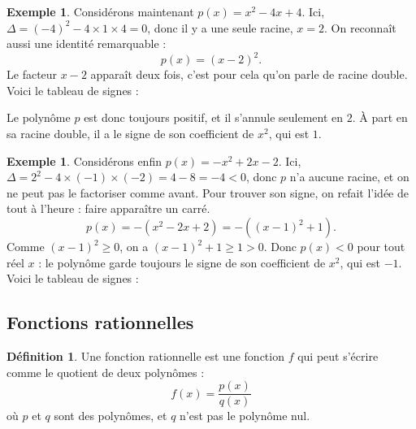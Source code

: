 \documentclass[12pt,a4paper]{article}
\theoremstyle{plain}
\theoremstyle{definition}
\newtheorem{definition}[theorem]{Définition}
\newtheorem{example}[theorem]{Exemple}
\theoremstyle{remark}
\begin{document}
\begin{example}
  Considérons maintenant $p(x) = x^2 - 4x + 4$. Ici,
  $\Delta = (-4)^2 - 4 \times 1 \times 4 = 0$, donc il y a une seule racine,
  $x = 2$. On reconnaît aussi une identité remarquable :
  \[
  p(x) = (x - 2)^2.
  \]
  Le facteur $x - 2$ apparaît deux fois, c'est pour cela qu'on parle de racine
  double. Voici le tableau de signes :
  
  \begin{center}
  \end{center}
  
  Le polynôme $p$ est donc toujours positif, et il s'annule seulement en $2$.
  À part en sa racine double, il a le signe de son coefficient de $x^2$, qui
  est $1$.
\end{example}

\begin{example}
  Considérons enfin $p(x) = -x^2 + 2x - 2$. Ici,
  $\Delta = 2^2 - 4 \times (-1) \times (-2) = 4 - 8 = -4 < 0$, donc $p$ n'a
  aucune racine, et on ne peut pas le factoriser comme avant. Pour trouver son
  signe, on refait l'idée de tout à l'heure : faire apparaître un carré.
  \[
  p(x) = -(x^2 - 2x + 2) = -\left((x - 1)^2 + 1\right).
  \]
  Comme $(x - 1)^2 \ge 0$, on a $(x - 1)^2 + 1 \ge 1 > 0$. Donc $p(x) < 0$ pour
  tout réel $x$ : le polynôme garde toujours le signe de son coefficient de
  $x^2$, qui est $-1$. Voici le tableau de signes :
  
  \begin{center}
  \end{center}
\end{example}

\subsection{Fonctions rationnelles}

\begin{tcolorbox}[navybar]
  \begin{definition}
    Une fonction rationnelle est une fonction $f$ qui peut s'écrire comme le
    quotient de deux polynômes :
    \[
    f(x) = \frac{p(x)}{q(x)}
    \]
    où $p$ et $q$ sont des polynômes, et $q$ n'est pas le polynôme nul.
  \end{definition}
\end{tcolorbox}
\end{document}
